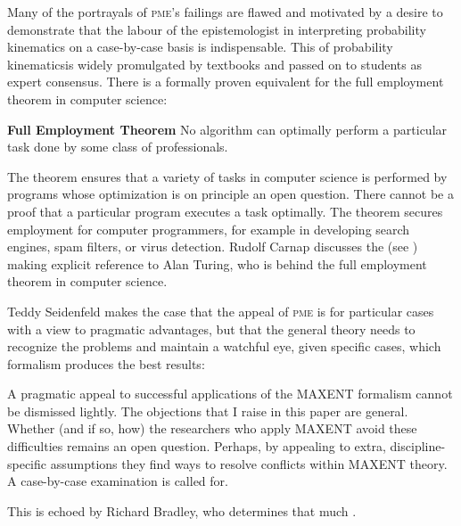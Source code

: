 \documentclass[phd,12pt,oneside]{ubcthesis}
\begin{document}
Many of the portrayals of \textsc{pme}'s failings are flawed and
motivated by a desire to demonstrate that the labour of the
epistemologist in interpreting probability kinematics on a
case-by-case basis is indispensable. This  of probability kinematicsis widely promulgated by textbooks
and passed on to students as expert consensus. There is a formally
proven equivalent for the full employment theorem in computer science:

\begin{quotex}
  \textbf{Full Employment Theorem} No algorithm can optimally perform
  a particular task done by some class of professionals.
\end{quotex}

The theorem ensures that a variety of tasks in computer science is
performed by programs whose optimization is on principle an open
question. There cannot be a proof that a particular program executes a
task optimally. The theorem secures employment for computer
programmers, for example in developing search engines, spam filters,
or virus detection. Rudolf Carnap discusses the  (see )
making explicit reference to Alan Turing, who is behind the full
employment theorem in computer science. 

Teddy Seidenfeld makes the case that the appeal of \textsc{pme} is for
particular cases with a view to pragmatic advantages, but that the
general theory needs to recognize the problems and maintain a watchful
eye, given specific cases, which formalism produces the best results:

\begin{quotex}
  A pragmatic appeal to successful applications of the MAXENT
  formalism cannot be dismissed lightly. The objections that I raise
  in this paper are general. Whether (and if so, how) the researchers
  who apply MAXENT avoid these difficulties remains an open question.
  Perhaps, by appealing to extra, discipline-specific assumptions they
  find ways to resolve conflicts within MAXENT theory. A case-by-case
  examination is called for. 
\end{quotex}

This is echoed by Richard Bradley, who determines that much
 .
\end{document}
